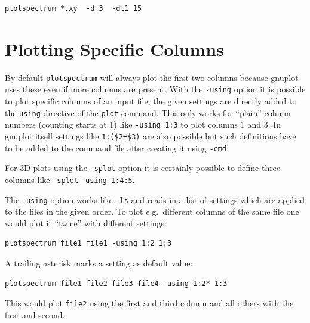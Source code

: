\documentclass[12pt, a4paper]{article}
\begin{document}
\begin{verbatim}
plotspectrum *.xy  -d 3  -dl1 15
\end{verbatim}




\section{Plotting Specific Columns}
\label{Sec:Using}

By default \verb'plotspectrum' will always plot the first two columns because gnuplot uses these even if more columns are present. With the \verb'-using' option it is possible to plot specific columns of an input file, the given settings are directly added to the \verb'using' directive of the \verb'plot' command. This only works for ``plain'' column numbers (counting starts at 1) like \verb'-using 1:3' to plot columns 1 and 3. In gnuplot itself settings like \verb'1:($2+$3)' are also possible but such definitions have to be added to the command file after creating it using \verb'-cmd'.

For 3D plots using the \verb'-splot' option it is certainly possible to define three columns like \verb'-splot' \verb'-using 1:4:5'.

The \verb'-using' option works like \verb'-ls' and reads in a list of settings which are applied to the files in the given order. To plot e.g.\ different columns of the same file one would plot it ``twice'' with different settings:

\begin{verbatim}
plotspectrum file1 file1 -using 1:2 1:3
\end{verbatim}

A trailing asterisk marks a setting as default value:

\begin{verbatim}
plotspectrum file1 file2 file3 file4 -using 1:2* 1:3
\end{verbatim}

This would plot \verb'file2' using the first and third column and all others with the first and second.


\end{document}

